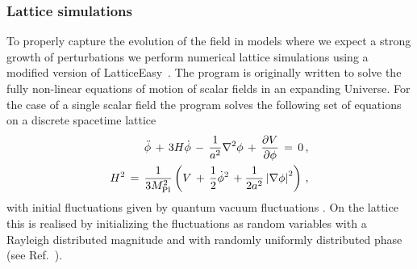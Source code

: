 \documentclass[12pt]{article}
\begin{document}
\subsubsection{Lattice simulations}
\label{sec:lattice simulations}
To properly capture the evolution of the field in models where we expect a strong growth of perturbations we perform numerical lattice simulations using a modified version of LatticeEasy~\cite{Felder:2000hq}. The program is originally written to solve the fully non-linear equations of motion of scalar fields in an expanding Universe. For the case of a single scalar field the program solves the following set of equations on a discrete spacetime lattice
\begin{eqnarray}
\ddot{\phi}\, + \, 3H\dot{\phi}\, - \,\frac{1}{a^2}\nabla^2\phi\, + \,\frac{\partial V}{\partial\phi} \, = \, 0\,, \label{eq:EOM_fld} \\
H^2\, = \,\frac{1}{3M^2_{\rm{Pl}}}\left( V\,  + \,\frac{1}{2}\dot{\phi}^2\, + \frac{1}{2a^2}\left|\nabla\phi\right|^2 \right)\,, \label{eq:EOM_hubble}
\end{eqnarray}
with initial fluctuations given by quantum vacuum fluctuations \cite{Polarski:1995jg,Khlebnikov:1996mc}. On the lattice this is realised by initializing the fluctuations as random variables with a Rayleigh distributed  magnitude and with randomly uniformly distributed phase (see Ref.~\cite{Felder:2000hq}).
\end{document}
